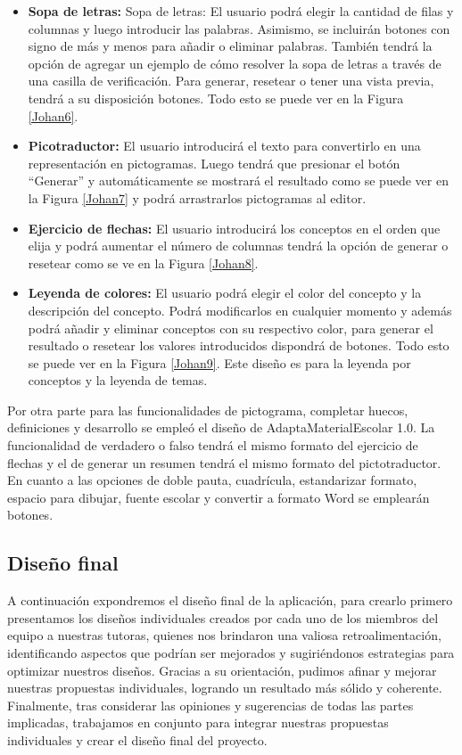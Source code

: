 \begin{itemize}
  \item \textbf{Sopa de letras:} Sopa de letras: El usuario podrá elegir la cantidad de filas y columnas y luego introducir las palabras. Asimismo, se incluirán botones con signo de más y menos para añadir o eliminar palabras. También tendrá la opción de agregar un ejemplo de cómo resolver la sopa de letras a través de una casilla de verificación. Para generar, resetear o tener una vista previa, tendrá a su disposición botones. Todo esto se puede ver en la Figura \ref{Johan6}.
  \item \textbf{Picotraductor:} El usuario introducirá el texto para convertirlo en una representación en pictogramas. Luego tendrá que presionar el botón ``Generar'' y automáticamente se mostrará el resultado como se puede ver en la Figura \ref{Johan7} y podrá arrastrarlos pictogramas al editor.
  \item \textbf{Ejercicio de flechas:} El usuario introducirá los conceptos en el orden que elija y podrá aumentar el número de columnas tendrá la opción de generar o resetear como se ve en la Figura \ref{Johan8}.
  \item  \textbf{Leyenda de colores:} El usuario podrá elegir el color del concepto y la descripción del concepto. Podrá modificarlos en cualquier momento y además podrá añadir y eliminar conceptos con su respectivo color, para generar el resultado o resetear los valores introducidos dispondrá de botones. Todo esto se puede ver en la Figura \ref{Johan9}. Este diseño es para la leyenda por conceptos y la leyenda de temas.
\end{itemize}

Por otra parte para las funcionalidades de pictograma, completar huecos, definiciones y desarrollo se empleó el diseño de AdaptaMaterialEscolar 1.0. La funcionalidad de verdadero o falso tendrá el mismo formato del ejercicio de flechas y el de generar un resumen tendrá el mismo formato del pictotraductor. En cuanto a las opciones de doble pauta, cuadrícula, estandarizar formato, espacio para dibujar, fuente escolar y convertir a formato Word se emplearán botones.

\subsection{Diseño final}\label{subsec:DisenyoFinal}
A continuación expondremos el diseño final de la aplicación, para crearlo primero presentamos los diseños individuales creados por cada uno de los miembros del equipo a nuestras tutoras, quienes nos brindaron una valiosa retroalimentación, identificando aspectos que podrían ser mejorados y sugiriéndonos estrategias para optimizar nuestros diseños. Gracias a su orientación, pudimos afinar y mejorar nuestras propuestas individuales, logrando un resultado más sólido y coherente. Finalmente, tras considerar las opiniones y sugerencias de todas las partes implicadas, trabajamos en conjunto para integrar nuestras propuestas individuales y crear el diseño final del proyecto.

